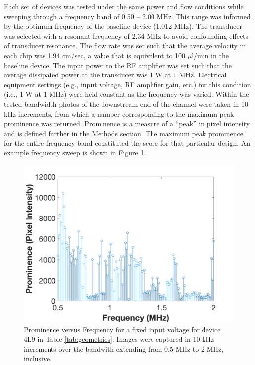 Each set of devices was tested under the same power and flow conditions while sweeping through a frequency band  of  0.50 -- 2.00 MHz.  This range was informed by the optimum frequency of the baseline device (1.012 MHz).  The transducer was selected with a resonant frequency of 2.34 MHz to avoid confounding effects of transducer resonance. The flow rate was set such that the average velocity in each chip was  1.94 cm/sec, a value that is equivalent to 100 $\mu$l/min in the baseline device. The input power to the RF amplifier was set such that the average dissipated power at the transducer was 1 W at 1 MHz. Electrical equipment settings (e.g., input voltage, RF amplifier gain, etc.) for this condition (i.e., 1 W at 1 MHz) were held constant as the frequency was varied. Within the tested bandwidth photos of the downstream end of the channel were taken in 10 kHz increments, from which a number corresponding to the maximum peak prominence was returned.   Prominence is a measure of a ``peak'' in pixel intensity and is defined further in the Methods section. The maximum peak prominence for the entire frequency band constituted the score for that particular design. An example frequency sweep is shown in Figure \ref{fig:freqSweep}.


\begin{figure}[htb]
  \begin{minipage}[t]{0.99\linewidth}\centering
	\includegraphics[width=12cm]{freqSweep}
  \end{minipage}\hfill
	\caption[Prominence versus frequency across swept bandwidth]{Prominence versus Frequency for a fixed input voltage for device 4L9 in Table \ref{tab:geometries}. Images were captured in 10 kHz increments over the bandwith extending from 0.5 MHz to 2 MHz, inclusive.}
	\label{fig:freqSweep}
\end{figure}

